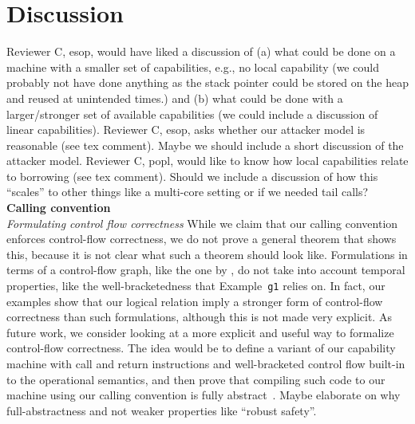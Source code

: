 \documentclass[format=acmsmall, review=false, screen=true]{acmart}
\newcommand{\itoplassug}[1]
    {{\color{Blue} #1}}
\begin{document}
\section{Discussion}
\label{sec:discussion}
\itoplassug{Reviewer C, esop, would have liked a discussion of (a) what could be done on a machine with a smaller set of capabilities, e.g., no local capability (we could probably not have done anything as the stack pointer could be stored on the heap and reused at unintended times.) and (b) what could be done with a larger/stronger set of available capabilities (we could include a discussion of linear capabilities).}
\itoplassug{Reviewer C, esop, asks whether our attacker model is reasonable (see tex comment). Maybe we should include a short discussion of the attacker model.}
\itoplassug{Reviewer C, popl, would like to know how local capabilities relate to borrowing (see tex comment).}
\itoplassug{Should we include a discussion of how this ``scales'' to other things like a multi-core setting or if we needed tail calls?}
\noindent\textbf{Calling convention}\\
\emph{Formulating control flow correctness} While we claim that our calling
convention enforces control-flow correctness, we do not prove a general theorem
that shows this, because it is not clear what such a theorem should look like.
Formulations in terms of a control-flow graph, like the one by \citet{abadi_control-flow_2005}, do not take into account temporal properties,
like the well-bracketedness that Example~\texttt{\footnotesize{g1}} relies on.
In fact, our examples show that our logical relation imply a stronger form of
control-flow correctness than such formulations, although this is not made very
explicit. As future work, we consider looking at a more explicit and useful way
to formalize control-flow correctness. The idea would be to define a variant
of our capability machine with call and return instructions and
well-bracketed control flow built-in to the operational semantics, and then
prove that compiling such code to our machine using our calling convention is
fully abstract~\citep{abadi_protection_1998}.
\itoplassug{Maybe elaborate on why full-abstractness and not weaker properties like ``robust safety''.}
\end{document}
